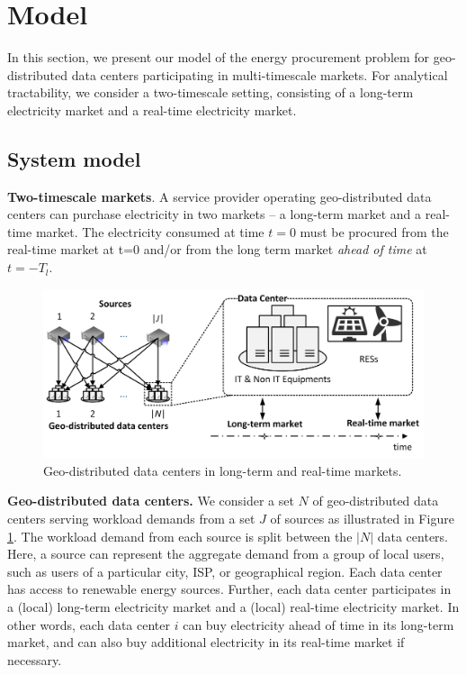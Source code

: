 \section{Model}
\label{sec:model}

In this section, we present our model of the energy procurement problem for geo-distributed data centers participating in multi-timescale markets. For analytical tractability, we consider a two-timescale setting, consisting of a long-term electricity market and a real-time electricity market.

\subsection{System model}


\textbf{Two-timescale markets}. A service provider operating geo-distributed data centers can purchase electricity in two markets -- a long-term market and a real-time market. The electricity consumed at time $t=0$ must be procured from the real-time market at t=0 and/or from the long term market {\em ahead of time} at $t=-T_l$. 


\begin{figure}[!t]
	\centering
	\includegraphics[width=1.0\linewidth]{figs/MultipleDataCenter}
	\vspace{-0.8cm}
	\caption{Geo-distributed data centers in long-term and real-time markets.}
	\label{fig:MultipleDataCenter}
	\vspace{-0.3cm}
\end{figure}

\textbf{Geo-distributed data centers.} We consider a set $N$ of geo-distributed data centers serving workload demands from a set $J$ of sources as illustrated in Figure \ref{fig:MultipleDataCenter}. The workload demand from each source is split between the $|N|$ data centers. Here, a source can represent the aggregate demand from a group of local users, such as users of a particular city, ISP, or geographical region. Each data center has access to renewable energy sources. Further, each data center participates in a (local) long-term electricity market and a (local) real-time electricity market. In other words, each data center $i$ can buy electricity ahead of time in its long-term market, and can also buy additional electricity in its real-time market if necessary. %

